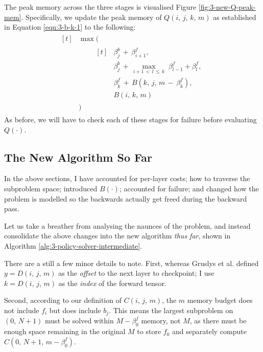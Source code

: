 The peak memory across the three stages is visualised Figure \ref{fig:3-new-Q-peak-mem}.
Specifically, we update the peak memory of \(Q(i,\,j,\,k,\,m)\) as established in Equation \ref{eqn:3-b-k-1} to the following:
\begin{align} \label{eqn:3-b-k-2}
    \begin{aligned}[t] %
        &\max(\\[0.5em]
        &\qquad\begin{aligned}[t]
            &\beta^b_j \,+\, \beta^f_{i+1}, \\[0.5em]
            &\beta^b_j \,+\, \max_{i+1 \,<\, l \,\leq\, k}\; \beta^f_{l-1} + \beta^f_l, \\[0.5em]
            &\beta^f_k \,+\, B(k,\, j,\, m\,-\,\beta^f_k), \\[0.5em]
            &B(i,\,k,\,m)
        \end{aligned} \\[0.5em]
        &)
\end{aligned}
\end{align}
As before, we will have to check each of these stages for failure before evaluating \(Q(\cdot)\).

\subsection{The New Algorithm So Far}
In the above sections, I have accounted for per-layer costs; how to traverse the subproblem space; introduced \(B(\cdot)\); accounted for failure; and changed how the problem is modelled so the backwards actually get freed during the backward pass.

Let us take a breather from analysing the naunces of the problem, and instead consolidate the above changes into the new algorithm \textit{thus far}, shown in Algorithm \ref{alg:3-policy-solver-intermediate}.

There are a still a few minor details to note. First, whereas Gruslys et al. defined \(y = D(i,\, j,\, m)\) as the \textit{offset} to the next layer to checkpoint; I use \(k = D(i,\,j,\,m)\) as the \textit{index} of the forward tensor.

Second, according to our definition of \(C(i,\,j,\,m)\), the \(m\) memory budget does not include \(f_i\) but does include \(b_j\).
This means the largest subproblem on \((0,\,N+1)\) must be solved within \(M-\beta^f_0\) memory, not \(M\), as there must be enough space remaining in the original \(M\) to store \(f_0\) and separately compute \(C(0,\,N+1,\,m-\beta^f_0)\).

